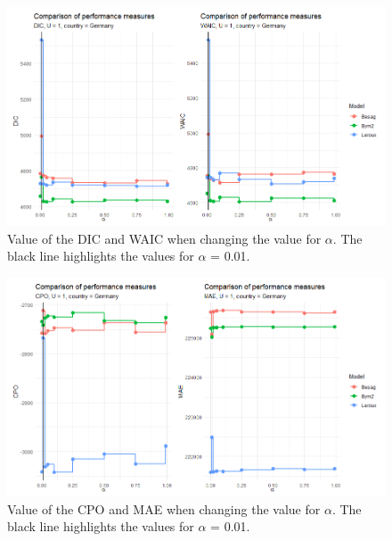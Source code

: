%     
\begin{figure}[H]
    \centering
    \includegraphics[width = \textwidth]{comparison_3_germany.png}
    \caption{Value of the DIC and WAIC when changing the value for $\alpha$. The black line highlights the values for $\alpha$ = 0.01.}
    \label{comparison_germany_3}
\end{figure}
%     
\begin{figure}[H]
    \centering
    \includegraphics[width = \textwidth]{comparison_4_germany.png}
    \caption{Value of the CPO and MAE when changing the value for $\alpha$. The black line highlights the values for $\alpha$ = 0.01.}
    \label{comparison_germany_4}
\end{figure}
%     
